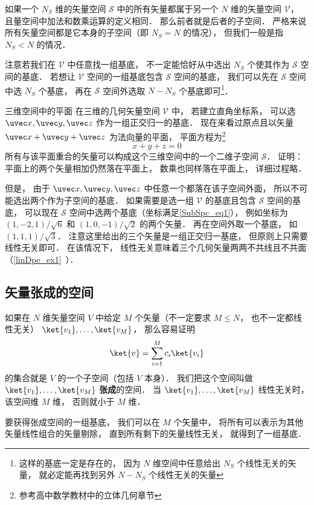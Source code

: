 

如果一个 $N_S$ 维的矢量空间 $\mathcal S$ 中的所有矢量都属于另一个 $N$ 维的矢量空间 $\mathcal V$， 且量空间中加法和数乘运算的定义相同． 那么前者就是后者的子空间． 严格来说所有矢量空间都是它本身的子空间（即 $N_S = N$ 的情况）， 但我们一般是指 $N_S < N$ 的情况．

注意若我们在 $\mathcal V$ 中任意找一组基底， 不一定能恰好从中选出 $N_S$ 个使其作为 $\mathcal S$ 空间的基底． 若想让 $\mathcal V$ 空间的一组基底包含 $\mathcal S$ 空间的基底， 我们可以先在 $\mathcal S$ 空间中选 $N_S$ 个基底， 再在 $\mathcal S$ 空间外选取 $N - N_S$ 个基底即可\footnote{这样的基底一定是存在的， 因为 $N$ 维空间中任意给出 $N_S$ 个线性无关的矢量， 就必定能再找到另外 $N - N_S$ 个线性无关的矢量}．

\begin{example}{三维空间中的平面}
在三维的几何矢量空间 $\mathcal V$ 中， 若建立直角坐标系， 可以选 $\uvec x, \uvec y, \uvec z$ 作为一组正交归一的基底． 现在来看过原点且以矢量 $\uvec x + \uvec y + \uvec z$ 为法向量的平面， 平面方程为\footnote{参考高中数学教材中的立体几何章节}
\begin{equation}\label{SubSpc_eq1}
x + y + z = 0
\end{equation}
所有与该平面重合的矢量可以构成这个三维空间中的一个二维子空间 $\mathcal S$． 证明： 平面上的两个矢量相加仍然落在平面上， 数乘也同样落在平面上， 详细过程略． 

但是， 由于 $\uvec x, \uvec y, \uvec z$ 中任意一个都落在该子空间外面， 所以不可能选出两个作为子空间的基底． 如果需要是选一组 $\mathcal V$ 的基底且包含 $\mathcal S$ 空间的基底， 可以现在 $\mathcal S$ 空间中选两个基底（坐标满足\autoref{SubSpc_eq1}）， 例如坐标为 $(1, -2, 1)/\sqrt{6}$ 和 $(1, 0, -1)/\sqrt{2}$ 的两个矢量． 再在空间外取一个基底， 如 $(1, 1, 1)/\sqrt{3}$． 注意这里给出的三个矢量是一组正交归一基底， 但原则上只需要线性无关即可． 在该情况下， 线性无关意味着三个几何矢量两两不共线且不共面（\autoref{linDpe_ex1}~）．
\end{example}

\subsection{矢量张成的空间}
如果在 $N$ 维矢量空间 $V$ 中给定 $M$ 个矢量（不一定要求 $M \leqslant N$， 也不一定都线性无关） $\ket{v_1}, \dots, \ket{v_M}$， 那么容易证明
\begin{equation}
\ket{v} = \sum_{i=1}^M c_i \ket{v_i}
\end{equation}
的集合就是 $V$ 的一个子空间（包括 $V$ 本身）． 我们把这个空间叫做 $\ket{v_1}, \dots, \ket{v_M}$ \textbf{张成}的空间． 当 $\ket{v_1}, \dots, \ket{v_M}$ 线性无关时， 该空间维 $M$ 维， 否则就小于 $M$ 维．

要获得张成空间的一组基底， 我们可以在 $M$ 个矢量中， 将所有可以表示为其他矢量线性组合的矢量剔除， 直到所有剩下的矢量线性无关， 就得到了一组基底．
